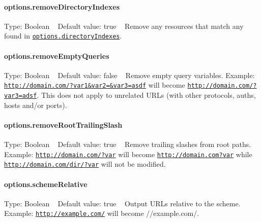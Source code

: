 \paragraph*{options.\+remove\+Directory\+Indexes}

Type\+: {\ttfamily Boolean} ~\newline
Default value\+: {\ttfamily true} ~\newline
 Remove any resources that match any found in \href{#options.directoryIndexes}{\tt {\ttfamily options.\+directory\+Indexes}}.

\paragraph*{options.\+remove\+Empty\+Queries}

Type\+: {\ttfamily Boolean} ~\newline
Default value\+: {\ttfamily false} ~\newline
 Remove empty query variables. Example\+: {\ttfamily \href{http://domain.com/?var1&var2=&var3=asdf}{\tt http\+://domain.\+com/?var1\&var2=\&var3=asdf}} will become {\ttfamily \href{http://domain.com/?var3=adsf}{\tt http\+://domain.\+com/?var3=adsf}}. This does not apply to unrelated U\+R\+Ls (with other protocols, auths, hosts and/or ports).

\paragraph*{options.\+remove\+Root\+Trailing\+Slash}

Type\+: {\ttfamily Boolean} ~\newline
Default value\+: {\ttfamily true} ~\newline
 Remove trailing slashes from root paths. Example\+: {\ttfamily \href{http://domain.com/?var}{\tt http\+://domain.\+com/?var}} will become {\ttfamily \href{http://domain.com?var}{\tt http\+://domain.\+com?var}} while {\ttfamily \href{http://domain.com/dir/?var}{\tt http\+://domain.\+com/dir/?var}} will not be modified.

\paragraph*{options.\+scheme\+Relative}

Type\+: {\ttfamily Boolean} ~\newline
Default value\+: {\ttfamily true} ~\newline
 Output U\+R\+Ls relative to the scheme. Example\+: {\ttfamily \href{http://example.com/}{\tt http\+://example.\+com/}} will become {\ttfamily //example.com/}.

